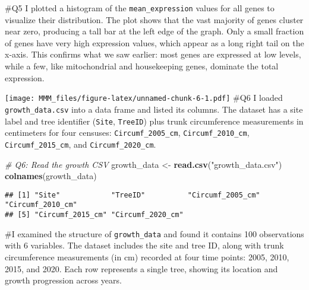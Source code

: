 \documentclass[
]{article}
\newenvironment{Shaded}{\begin{snugshade}}{\end{snugshade}}
\newcommand{\AttributeTok}[1]{\textcolor[rgb]{0.13,0.29,0.53}{#1}}
\newcommand{\CommentTok}[1]{\textcolor[rgb]{0.56,0.35,0.01}{\textit{#1}}}
\newcommand{\DecValTok}[1]{\textcolor[rgb]{0.00,0.00,0.81}{#1}}
\newcommand{\FunctionTok}[1]{\textcolor[rgb]{0.13,0.29,0.53}{\textbf{#1}}}
\newcommand{\NormalTok}[1]{#1}
\newcommand{\OtherTok}[1]{\textcolor[rgb]{0.56,0.35,0.01}{#1}}
\newcommand{\SpecialCharTok}[1]{\textcolor[rgb]{0.81,0.36,0.00}{\textbf{#1}}}
\newcommand{\StringTok}[1]{\textcolor[rgb]{0.31,0.60,0.02}{#1}}
\begin{document}
\#Q5 I plotted a histogram of the \texttt{mean\_expression} values for
all genes to visualize their distribution. The plot shows that the vast
majority of genes cluster near zero, producing a tall bar at the left
edge of the graph. Only a small fraction of genes have very high
expression values, which appear as a long right tail on the x-axis. This
confirms what we saw earlier: most genes are expressed at low levels,
while a few, like mitochondrial and housekeeping genes, dominate the
total expression.

\begin{Shaded}
\end{Shaded}

\texttt{[image: MMM\_files/figure-latex/unnamed-chunk-6-1.pdf]} \#Q6 I
loaded \texttt{growth\_data.csv} into a data frame and listed its
columns. The dataset has a site label and tree identifier
(\texttt{Site}, \texttt{TreeID}) plus trunk circumference measurements
in centimeters for four censuses: \texttt{Circumf\_2005\_cm},
\texttt{Circumf\_2010\_cm}, \texttt{Circumf\_2015\_cm}, and
\texttt{Circumf\_2020\_cm}.

\begin{Shaded}
\begin{Highlighting}[]
\CommentTok{\# Q6: Read the growth CSV}
\NormalTok{growth\_data }\OtherTok{\textless{}{-}} \FunctionTok{read.csv}\NormalTok{(}\StringTok{"growth\_data.csv"}\NormalTok{)}
\FunctionTok{colnames}\NormalTok{(growth\_data)}
\end{Highlighting}
\end{Shaded}

\begin{verbatim}
## [1] "Site"            "TreeID"          "Circumf_2005_cm" "Circumf_2010_cm"
## [5] "Circumf_2015_cm" "Circumf_2020_cm"
\end{verbatim}

\#I examined the structure of \texttt{growth\_data} and found it
contains 100 observations with 6 variables. The dataset includes the
site and tree ID, along with trunk circumference measurements (in cm)
recorded at four time points: 2005, 2010, 2015, and 2020. Each row
represents a single tree, showing its location and growth progression
across years.
\end{document}
